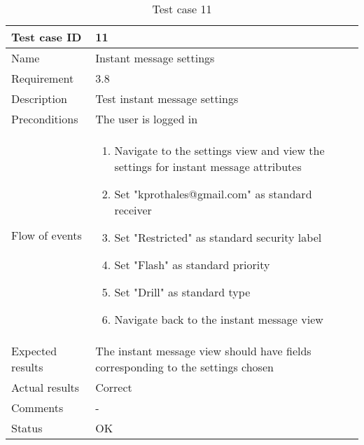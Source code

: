 		\begin{table}[htb]
			\begin{tabular}{l|p{10cm}}
				Test case ID & 11 \\ \hline
				Name & Instant message settings\\ \hline
				Requirement & 3.8\\ \hline
				Description & Test instant message settings\\ \hline
				Preconditions & The user is logged in\\ \hline
				Flow of events & 
					\begin{enumerate}
						\item{}Navigate to the settings view and view the settings for instant message attributes
						\item{}Set "kprothales@gmail.com" as standard receiver
						\item{}Set "Restricted" as standard security label
						\item{}Set "Flash" as standard priority
						\item{}Set "Drill" as standard type
						\item{}Navigate back to the instant message view
					\end{enumerate} \\ \hline
				Expected results & The instant message view should have fields corresponding to the settings chosen \\ \hline
				Actual results &Correct\\ \hline
				Comments &-\\ \hline
				Status & OK\\ \hline
			\end{tabular}
			\caption{Test case 11} \label{tab:case11}
		\end{table}

